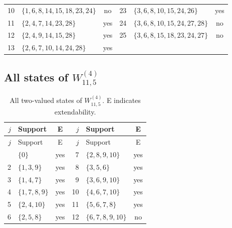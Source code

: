 \documentclass[aps,pra,reprint,superscriptaddress,longbibliography,nofootinbib,floatfix,10pt]{revtex4-2}
\theoremstyle{definition}
\begin{document}
\begin{longtable}{rlc@{\qquad}rlc}
10 & $\{1,\allowbreak 6,\allowbreak 8,\allowbreak 14,\allowbreak 15,\allowbreak 18,\allowbreak 23,\allowbreak 24\}$ & no & 23 & $\{3,\allowbreak 6,\allowbreak 8,\allowbreak 10,\allowbreak 15,\allowbreak 24,\allowbreak 26\}$ & yes\\
11 & $\{2,\allowbreak 4,\allowbreak 7,\allowbreak 14,\allowbreak 23,\allowbreak 28\}$ & yes & 24 & $\{3,\allowbreak 6,\allowbreak 8,\allowbreak 10,\allowbreak 15,\allowbreak 24,\allowbreak 27,\allowbreak 28\}$ & no\\
12 & $\{2,\allowbreak 4,\allowbreak 9,\allowbreak 14,\allowbreak 15,\allowbreak 28\}$ & yes & 25 & $\{3,\allowbreak 6,\allowbreak 8,\allowbreak 15,\allowbreak 18,\allowbreak 23,\allowbreak 24,\allowbreak 27\}$ & no\\
13 & $\{2,\allowbreak 6,\allowbreak 7,\allowbreak 10,\allowbreak 14,\allowbreak 24,\allowbreak 28\}$ & yes &  &  & \\
\end{longtable}\endgroup
{}\subsection{All states of \texorpdfstring{$W_{11,5}^{(4)}$}{gadget 4a}}
\begingroup\footnotesize\setlength{\tabcolsep}{3pt}\setlength{\LTpre}{5pt}\setlength{\LTpost}{8pt}
\begin{longtable}{rlc@{\qquad}rlc}
\caption{All two-valued states of $W_{11,5}^{(4)}$. E indicates extendability.}\label{tab:states-4a}\\\toprule $j$ & Support & E & $j$ & Support & E\\\midrule\endfirsthead
\toprule $j$ & Support & E & $j$ & Support & E\\\midrule\endhead\bottomrule\endfoot
1 & $\{0\}$ & yes & 7 & $\{2,\allowbreak 8,\allowbreak 9,\allowbreak 10\}$ & yes\\
2 & $\{1,\allowbreak 3,\allowbreak 9\}$ & yes & 8 & $\{3,\allowbreak 5,\allowbreak 6\}$ & yes\\
3 & $\{1,\allowbreak 4,\allowbreak 7\}$ & yes & 9 & $\{3,\allowbreak 6,\allowbreak 9,\allowbreak 10\}$ & yes\\
4 & $\{1,\allowbreak 7,\allowbreak 8,\allowbreak 9\}$ & yes & 10 & $\{4,\allowbreak 6,\allowbreak 7,\allowbreak 10\}$ & yes\\
5 & $\{2,\allowbreak 4,\allowbreak 10\}$ & yes & 11 & $\{5,\allowbreak 6,\allowbreak 7,\allowbreak 8\}$ & yes\\
6 & $\{2,\allowbreak 5,\allowbreak 8\}$ & yes & 12 & $\{6,\allowbreak 7,\allowbreak 8,\allowbreak 9,\allowbreak 10\}$ & no\\
\end{longtable}\endgroup
\end{document}
